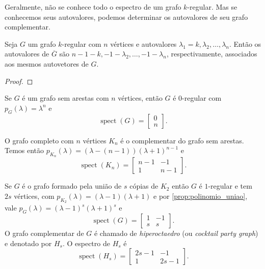 \documentclass{article}
\DeclareMathOperator{\spect}{spect}
\begin{document}
Geralmente, não se conhece todo o espectro de um grafo \(k\)-regular. Mas se conhecemos seus autovalores, podemos determinar os autovalores de seu grafo complementar.

\begin{prop}
    Seja \(G\) um grafo \(k\)-regular com \(n\) vértices e autovalores \(\lambda_1 = k, \lambda_2, \ldots, \lambda_n\). Então os autovalores de \(\overline{G}\) são \(n-1-k, -1-\lambda_2, \ldots, -1-\lambda_n\), respectivamente, associados aos mesmos autovetores de \(G\).
\end{prop}

\begin{proof}
    
\end{proof}

\begin{exmp}
    Se \(G\) é um grafo sem arestas com \(n\) vértices, então \(G\) é \(0\)-regular com \(p_G(\lambda) = \lambda^n\) e \[\spect(G) = \begin{bmatrix}
        0 \\
        n
    \end{bmatrix}.\]
\end{exmp}

\begin{exmp}
    O grafo completo com \(n\) vértices \(K_n\) é o complementar do grafo sem arestas. Temos então \(p_{K_n}(\lambda) = (\lambda - (n-1))(\lambda + 1)^{n-1}\) e \[\spect(K_n) = \begin{bmatrix}
        n-1 & -1 \\
        1 & n-1
    \end{bmatrix}.\]
\end{exmp}

\begin{exmp}
    Se \(G\) é o grafo formado pela união de \(s\) cópias de \(K_2\) então \(G\) é \(1\)-regular e tem \(2s\) vértices, com \(p_{K_2} (\lambda) = (\lambda - 1)(\lambda + 1)\) e por \ref{prop:polinomio_uniao}, vale \(p_G (\lambda) = (\lambda - 1)^s(\lambda + 1)^s\) e \[ \spect(G) = \begin{bmatrix}
        1 & -1 \\
        s & s
    \end{bmatrix}.\] O grafo complementar de \(G\) é chamado de \emph{hiperoctaedro} (ou \emph{cocktail party graph}) e denotado por \(H_s\). O espectro de \(H_s\) é \[\spect(H_s) = \begin{bmatrix}
        2s-1 & -1 \\
        1 & 2s-1
    \end{bmatrix}.\]
\end{exmp}
\end{document}
